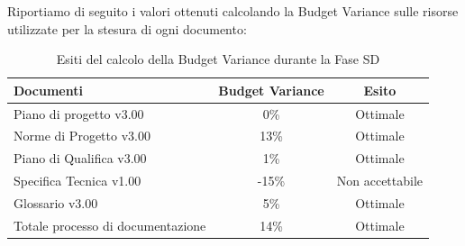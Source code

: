 			Riportiamo di seguito i valori ottenuti calcolando la Budget Variance sulle risorse utilizzate per la stesura di ogni documento:
			\begin{table}[H]
					\centering
					\begin{tabu}{| l | c | c |}
							\hline
							Documenti 							& Budget Variance	& Esito		\\ \hline \hline
							
							Piano di progetto v3.00				& 0\% 		& Ottimale  \\ \hline
							Norme di Progetto v3.00 			& 13\%		& Ottimale  \\ \hline
							Piano di Qualifica v3.00 			& 1\%		& Ottimale  \\ \hline
							Specifica Tecnica v1.00 			& -15\%		& Non accettabile  \\ \hline
							Glossario v3.00					 	& 5\% 		& Ottimale  \\ \hline
							Totale processo di documentazione & 14\% & Ottimale \\ \hline
						\end{tabu}
					\caption{Esiti del calcolo della Budget Variance durante la Fase SD}
				\end{table}

